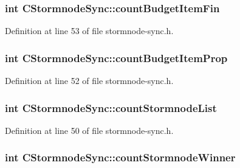 \subsubsection[{count\+Budget\+Item\+Fin}]{\setlength{\rightskip}{0pt plus 5cm}int C\+Stormnode\+Sync\+::count\+Budget\+Item\+Fin}\label{class_c_stormnode_sync_a2a5824d8f6eddbdb6aec4daa51cae6a4}


Definition at line 53 of file stormnode-\/sync.\+h.

\hypertarget{class_c_stormnode_sync_af73aa6104e72c120d7def3f42bab1dc5}{}
\subsubsection[{count\+Budget\+Item\+Prop}]{\setlength{\rightskip}{0pt plus 5cm}int C\+Stormnode\+Sync\+::count\+Budget\+Item\+Prop}\label{class_c_stormnode_sync_af73aa6104e72c120d7def3f42bab1dc5}


Definition at line 52 of file stormnode-\/sync.\+h.

\hypertarget{class_c_stormnode_sync_a5b480191e47be00a7b1919244b5f9714}{}
\subsubsection[{count\+Stormnode\+List}]{\setlength{\rightskip}{0pt plus 5cm}int C\+Stormnode\+Sync\+::count\+Stormnode\+List}\label{class_c_stormnode_sync_a5b480191e47be00a7b1919244b5f9714}


Definition at line 50 of file stormnode-\/sync.\+h.

\hypertarget{class_c_stormnode_sync_ad0db06b3a1913c0c40c8e6719953d346}{}
\subsubsection[{count\+Stormnode\+Winner}]{\setlength{\rightskip}{0pt plus 5cm}int C\+Stormnode\+Sync\+::count\+Stormnode\+Winner}\label{class_c_stormnode_sync_ad0db06b3a1913c0c40c8e6719953d346}



